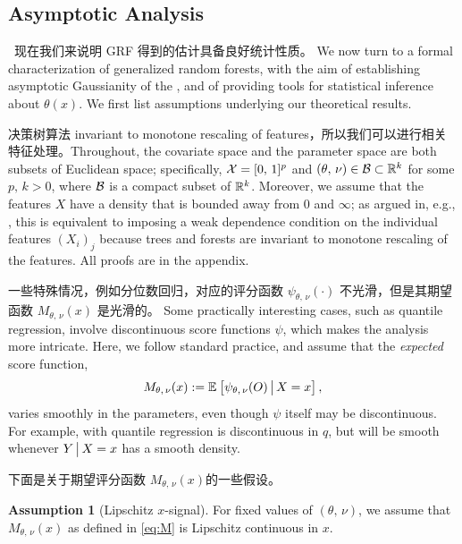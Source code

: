 \documentclass[aos]{imsart}
\theoremstyle{plain}
\theoremstyle{definition}
\newtheorem{assu}{Assumption}
\theoremstyle{remark}
\begin{document}
\begin{CJK}{UTF8}{gbsn}


\newpage

\section{Asymptotic Analysis}
\label{sec:theory}

\, 现在我们来说明 GRF 得到的估计具备良好统计性质。
We now turn to a formal characterization of generalized random forests, with the aim of
establishing asymptotic Gaussianity of the , and of providing
tools for statistical inference about $\theta(x)$.
We first list assumptions underlying our theoretical results. 


决策树算法 invariant to monotone rescaling of features，所以我们可以进行相关特征处理。Throughout, the covariate space and the parameter space are both subsets of Euclidean space; specifically, $\mathcal{X} = [0, \, 1]^p$ and $(\theta, \, \nu) \in \mathcal{B} \subset \mathbb{R}^k$ for some $p, \, k > 0$, where $\mathcal{B}$ is a compact subset of $\mathbb{R}^k$. Moreover, we assume that the features $X$ have a density that is bounded away from 0 and $\infty$; as argued in, e.g., \citet{wager2015uniform}, this is equivalent to imposing a weak dependence condition on the individual features $(X_i)_j$ because trees and forests are invariant to monotone rescaling of the features. All proofs are in the appendix.

一些特殊情况，例如分位数回归，对应的评分函数 $\psi_{\theta, \, \nu}(\cdot)$ 不光滑，但是其期望函数 $M_{\theta, \, \nu}(x)$ 是光滑的。 Some practically interesting cases, such as quantile regression, involve discontinuous score functions $\psi$, which makes the analysis more intricate. Here, we follow standard practice, and assume that the \emph{expected} score function,
\begin{equation}
\label{eq:M}
M_{\theta, \, \nu}(x) := \EE{\psi_{\theta, \, \nu}(O) \cond X = x},
\end{equation}
varies smoothly in the parameters, even though $\psi$ itself may be
discontinuous. For example, with quantile regression
 is discontinuous in $q$,
but  will be smooth
whenever $Y\,\big|\, X = x$ has a smooth density.


下面是关于期望评分函数 $M_{\theta, \, \nu}(x)$的一些假设。
\begin{assu}[Lipschitz $x$-signal]
\label{assu:lip}
For fixed values of $(\theta, \, \nu)$, we assume that $M_{\theta, \, \nu}(x)$ 
as defined in \eqref{eq:M} is Lipschitz continuous in $x$.
\end{assu}


\end{CJK}
\end{document}
